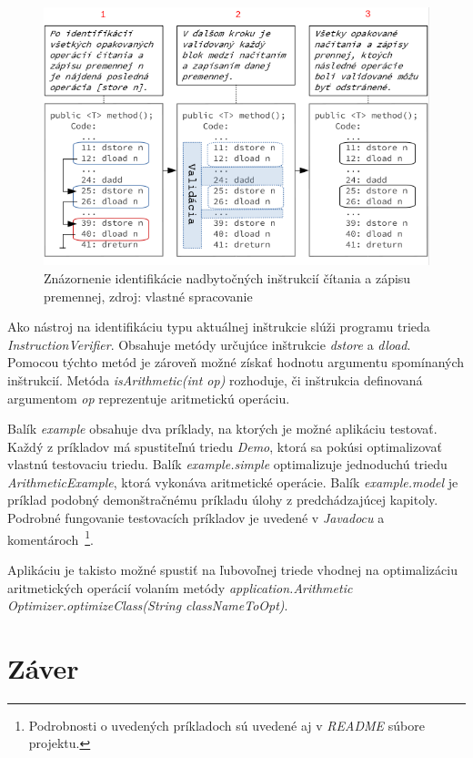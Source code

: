\documentclass[11pt,final,oneside]{fithesis}
\begin{document}
\begin{figure}[h]
  \centering
   \includegraphics[width=\textwidth]{identification.png}
  \caption{Znázornenie identifikácie nadbytočných inštrukcií čítania a zápisu 
  premennej, zdroj: vlastné spracovanie}
  \label{fig:identify}
\end{figure}

Ako nástroj na identifikáciu typu aktuálnej inštrukcie slúži programu trieda 
\textit{InstructionVerifier}. Obsahuje metódy určujúce inštrukcie 
\textit{dstore} a \textit{dload}. Pomocou týchto metód je zároveň možné získať 
hodnotu argumentu spomínaných inštrukcií. Metóda \textit{isArithmetic(int op)} 
rozhoduje, či inštrukcia definovaná argumentom \textit{op} reprezentuje 
aritmetickú operáciu.

Balík \textit{example} obsahuje dva príklady, na ktorých je možné aplikáciu 
testovať. Každý z príkladov má spustiteľnú triedu \textit{Demo}, ktorá sa 
pokúsi optimalizovať vlastnú testovaciu triedu. Balík \textit{example.simple} 
optimalizuje jednoduchú triedu \textit{ArithmeticExample}, ktorá vykonáva 
aritmetické operácie. Balík \textit{example.model} je príklad podobný 
demonštračnému príkladu úlohy z predchádzajúcej kapitoly. Podrobné fungovanie 
testovacích príkladov je uvedené v \textit{Javadocu} a
komentároch~\footnote{Podrobnosti o uvedených príkladoch sú uvedené aj
v \textit{README} súbore projektu.}.

Aplikáciu je takisto možné spustiť na ľubovoľnej triede vhodnej na 
optimalizáciu aritmetických operácií volaním metódy
\textit{application.Arithmetic Optimizer.optimizeClass(String classNameToOpt)}.

\chapter{Záver}
\end{document}
